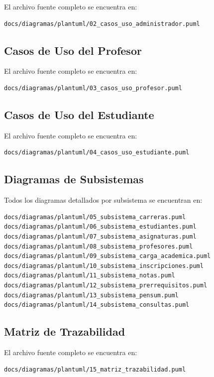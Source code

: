 \documentclass[12pt,a4paper]{article}
\begin{document}
El archivo fuente completo se encuentra en:
\begin{lstlisting}
docs/diagramas/plantuml/02_casos_uso_administrador.puml
\end{lstlisting}

\subsection{Casos de Uso del Profesor}

El archivo fuente completo se encuentra en:
\begin{lstlisting}
docs/diagramas/plantuml/03_casos_uso_profesor.puml
\end{lstlisting}

\subsection{Casos de Uso del Estudiante}

El archivo fuente completo se encuentra en:
\begin{lstlisting}
docs/diagramas/plantuml/04_casos_uso_estudiante.puml
\end{lstlisting}

\subsection{Diagramas de Subsistemas}

Todos los diagramas detallados por subsistema se encuentran en:
\begin{lstlisting}
docs/diagramas/plantuml/05_subsistema_carreras.puml
docs/diagramas/plantuml/06_subsistema_estudiantes.puml
docs/diagramas/plantuml/07_subsistema_asignaturas.puml
docs/diagramas/plantuml/08_subsistema_profesores.puml
docs/diagramas/plantuml/09_subsistema_carga_academica.puml
docs/diagramas/plantuml/10_subsistema_inscripciones.puml
docs/diagramas/plantuml/11_subsistema_notas.puml
docs/diagramas/plantuml/12_subsistema_prerrequisitos.puml
docs/diagramas/plantuml/13_subsistema_pensum.puml
docs/diagramas/plantuml/14_subsistema_consultas.puml
\end{lstlisting}

\subsection{Matriz de Trazabilidad}

El archivo fuente completo se encuentra en:
\begin{lstlisting}
docs/diagramas/plantuml/15_matriz_trazabilidad.puml
\end{lstlisting}

\end{document}
